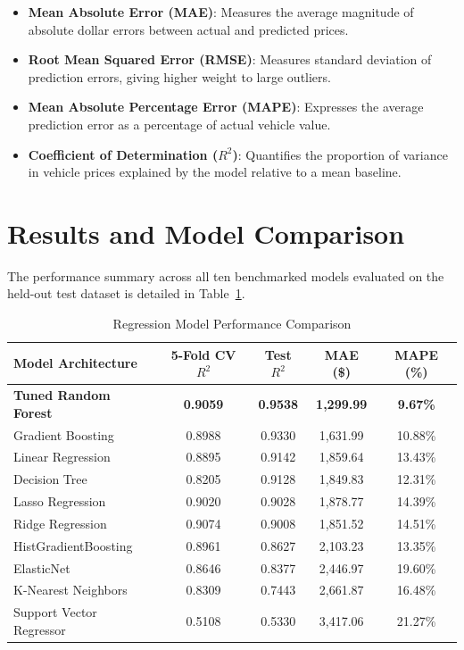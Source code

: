 \documentclass[conference]{IEEEtran}
\begin{document}
\begin{itemize}
    \item \textbf{Mean Absolute Error (MAE)}: Measures the average magnitude of absolute dollar errors between actual and predicted prices.
    \item \textbf{Root Mean Squared Error (RMSE)}: Measures standard deviation of prediction errors, giving higher weight to large outliers.
    \item \textbf{Mean Absolute Percentage Error (MAPE)}: Expresses the average prediction error as a percentage of actual vehicle value.
    \item \textbf{Coefficient of Determination ($R^2$)}: Quantifies the proportion of variance in vehicle prices explained by the model relative to a mean baseline.
\end{itemize}

\section{Results and Model Comparison}
The performance summary across all ten benchmarked models evaluated on the held-out test dataset is detailed in Table~\ref{tab:results}.

\begin{table}[htbp]
\caption{Regression Model Performance Comparison}
\begin{center}
\begin{tabular}{lcccc}
\toprule
\textbf{Model Architecture} & \textbf{5-Fold CV $R^2$} & \textbf{Test $R^2$} & \textbf{MAE (\$)} & \textbf{MAPE (\%)} \\
\midrule
\textbf{Tuned Random Forest} & \textbf{0.9059} & \textbf{0.9538} & \textbf{1,299.99} & \textbf{9.67\%} \\
Gradient Boosting & 0.8988 & 0.9330 & 1,631.99 & 10.88\% \\
Linear Regression & 0.8895 & 0.9142 & 1,859.64 & 13.43\% \\
Decision Tree & 0.8205 & 0.9128 & 1,849.83 & 12.31\% \\
Lasso Regression & 0.9020 & 0.9028 & 1,878.77 & 14.39\% \\
Ridge Regression & 0.9074 & 0.9008 & 1,851.52 & 14.51\% \\
HistGradientBoosting & 0.8961 & 0.8627 & 2,103.23 & 13.35\% \\
ElasticNet & 0.8646 & 0.8377 & 2,446.97 & 19.60\% \\
K-Nearest Neighbors & 0.8309 & 0.7443 & 2,661.87 & 16.48\% \\
Support Vector Regressor & 0.5108 & 0.5330 & 3,417.06 & 21.27\% \\
\bottomrule
\end{tabular}
\label{tab:results}
\end{center}
\end{table}
\end{document}
